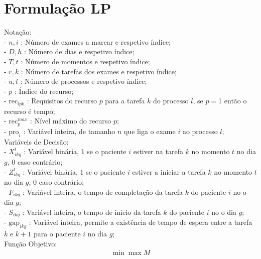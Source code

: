 \section{Formulação LP}
\label{sec:form}

Notação:\\
- $n,i$ : Número de exames a marcar e respetivo índice; \\
- $D,h$ : Número de dias e respetivo índice; \\
- $T,t$ : Número de momentos e respetivo índice; \\
- $r,k$ : Número de tarefas dos exames e respetivo índice; \\
- $u,l$ : Número de processos e respetivo índice; \\
- $p$ : Índice do recurso; \\
- $\text{rec}_{lpk}$ : Requisitos do recurso $p$ para a tarefa $k$ do processo $l$, se $p=$1 então o recurso é tempo; \\
- $\text{rec}^{max}_{p}$ : Nível máximo do recurso $p$; \\
- $\text{pro}_{i}$ : Variável inteira, de tamanho $n$ que liga o exame $i$ ao processo $l$; \\

Variáveis de Decisão: \\
- $X^{t}_{ikg}$ : Variável binária, 1 se o paciente $i$ estiver na tarefa $k$ no momento $t$ no dia $g$, 0 caso contrário; \\
- $Z^{t}_{ikg}$ : Variável binária, 1 se o paciente $i$ estiver a iniciar a tarefa $k$ no momento $t$ no dia $g$, 0 caso contrário; \\
- $F_{ikg}$ : Variável inteira, o tempo de completação da tarefa $k$ do paciente $i$ no o dia $g$; \\
- $S_{ikg}$ : Variável inteira, o tempo de início da tarefa $k$ do paciente $i$ no o dia $g$; \\
- $\text{gap}_{ikg}$ : Variável inteira, permite a existência de tempo de espera entre a tarefa $k$ e $k+1$ para o paciente $i$ no dia $g$; \\

Função Objetivo:
\begin{align}
\min \max M \label{eq:1}
\end{align}

